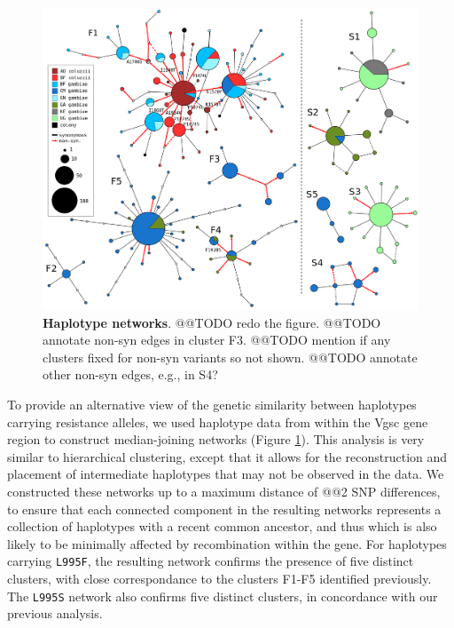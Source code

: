 \documentclass[a4paper,11pt,abstracton]{scrartcl}
\begin{document}
%
\begin{figure}[!b]
  \includegraphics[width=1.1\linewidth,center]{artwork/fig_networks.png}
  \caption{\textbf{Haplotype networks}. @@TODO redo the figure. @@TODO annotate non-syn edges in cluster F3. @@TODO mention if any clusters fixed for non-syn variants so not shown. @@TODO annotate other non-syn edges, e.g., in S4?}
  \label{fig:networks}
\end{figure}


%
To provide an alternative view of the genetic similarity between haplotypes carrying resistance alleles, we used haplotype data from within the Vgsc gene region to construct median-joining networks (Figure \ref{fig:networks}).
%
This analysis is very similar to hierarchical clustering, except that it allows for the reconstruction and placement of intermediate haplotypes that may not be observed in the data.
%
We constructed these networks up to a maximum distance of @@2 SNP differences, to ensure that each connected component in the resulting networks represents a collection of haplotypes with a recent common ancestor, and thus which is also likely to be minimally affected by recombination within the gene.
%
For haplotypes carrying \texttt{L995F}, the resulting network confirms the presence of five distinct clusters, with close correspondance to the clusters F1-F5 identified previously.
%
The \texttt{L995S} network also confirms five distinct clusters, in concordance with our previous analysis.
%
\end{document}
